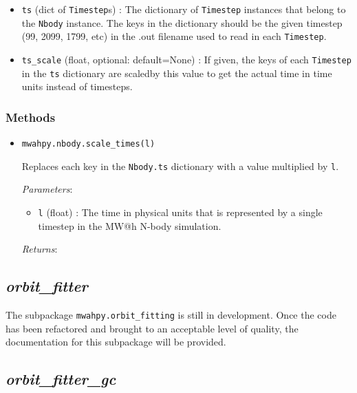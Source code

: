 \documentclass{article}
\begin{document}
\begin{itemize}

\item \verb!ts! (dict of \verb!Timestep!s) : The dictionary of \verb!Timestep! instances that belong to the \verb!Nbody! instance. The keys in the dictionary should be the given timestep (99, 2099, 1799, etc) in the .out filename used to read in each \verb!Timestep!.

\item \verb!ts_scale! (float, optional: default=None) : If given, the keys of each \verb!Timestep! in the \verb!ts! dictionary are scaledby this value to get the actual time in time units instead of timesteps. 

\end{itemize}

\subsubsection{Methods}

\begin{itemize}



\item \verb!mwahpy.nbody.scale_times(l)!

Replaces each key in the \verb!Nbody.ts! dictionary with a value multiplied by \verb!l!.

\textit{Parameters}: \begin{itemize}

\item \verb!l! (float) : The time in physical units that is represented by a single timestep in the MW@h N-body simulation.

\end{itemize}

\textit{Returns}:



\end{itemize}

\subsection{\textit{orbit\_fitter}}

The subpackage \verb!mwahpy.orbit_fitting! is still in development. Once the code has been refactored and brought to an acceptable level of quality, the documentation for this subpackage will be provided. 

\subsection{\textit{orbit\_fitter\_gc}}
\end{document}
